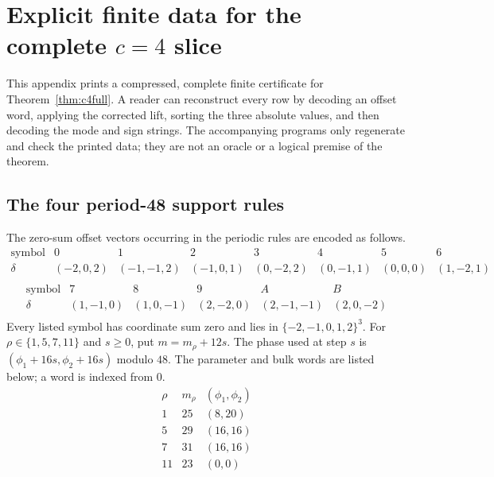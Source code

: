\section{Explicit finite data for the complete \texorpdfstring{$c=4$}{c=4} slice}\label{sec:c4-data}
This appendix prints a compressed, complete finite certificate for
Theorem~\ref{thm:c4full}.  A reader can reconstruct every row by decoding an offset
word, applying the corrected lift, sorting the three absolute values, and then decoding
the mode and sign strings.  The accompanying programs only regenerate and check the
printed data; they are not an oracle or a logical premise of the theorem.

\subsection{The four period-48 support rules}\label{sec:c4-support-data}
The zero-sum offset vectors occurring in the periodic rules are encoded as follows.
\begingroup\scriptsize\[
\begin{array}{c|ccccccc}
\text{symbol}&0&1&2&3&4&5&6\\\hline
\delta&(-2,0,2)&(-1,-1,2)&(-1,0,1)&(0,-2,2)&(0,-1,1)&(0,0,0)&(1,-2,1)\\
\end{array}\]\endgroup
\begingroup\scriptsize\[
\begin{array}{c|ccccc}
\text{symbol}&7&8&9&A&B\\\hline
\delta&(1,-1,0)&(1,0,-1)&(2,-2,0)&(2,-1,-1)&(2,0,-2)\\
\end{array}\]\endgroup
Every listed symbol has coordinate sum zero and lies in
$\{-2,-1,0,1,2\}^3$.
For $\rho\in\{1,5,7,11\}$ and $s\ge0$, put $m=m_\rho+12s$.  The phase used at step $s$
is $(\phi_1+16s,\phi_2+16s)$ modulo $48$.  The parameter and bulk words are
listed below; a word is indexed from $0$.
\[\begin{array}{c|c|c}
\rho&m_\rho&(\phi_1,\phi_2)\\\hline
1&25&(8,20)\\
5&29&(16,16)\\
7&31&(16,16)\\
11&23&(0,0)\\
\end{array}\]
\begingroup\scriptsize

